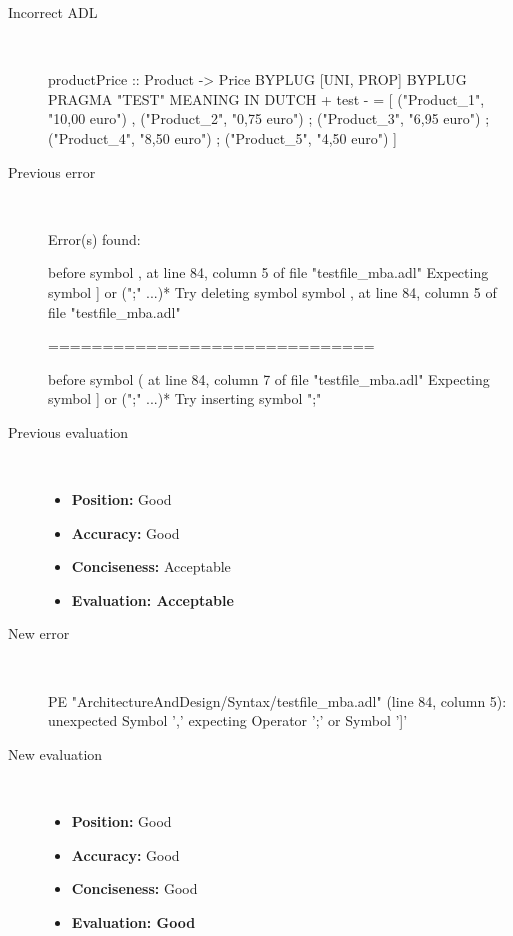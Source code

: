 \begin{description}
  \item[Incorrect ADL]~\\
\begin{adl}
productPrice :: Product -> Price BYPLUG [UNI, PROP] BYPLUG PRAGMA "TEST"
MEANING IN DUTCH  {+ test -}
  = [ ("Product_1", "10,00 euro")
    , ("Product_2", "0,75 euro")
    ; ("Product_3", "6,95 euro")
    ; ("Product_4", "8,50 euro")
    ; ("Product_5", "4,50 euro")
    ]\end{adl}
  \item[Previous error]~\\
\begin{haskell}
Error(s) found:

before symbol , at line 84, column 5 of file "testfile_mba.adl"
Expecting symbol ] or (";" ...)*
Try deleting symbol symbol , at line 84, column 5 of file "testfile_mba.adl"

==============================

before symbol ( at line 84, column 7 of file "testfile_mba.adl"
Expecting symbol ] or (";" ...)*
Try inserting symbol ";"
\end{haskell}
  \item[Previous evaluation]~\\
    \begin{itemize}
    \item \textbf{Position:} Good
    \item \textbf{Accuracy:} Good
    \item \textbf{Conciseness:} Acceptable
    \item \textbf{Evaluation: Acceptable}
    \end{itemize}
  \item[New error]~\\
\begin{haskell}
PE "ArchitectureAndDesign/Syntax/testfile_mba.adl" (line 84, column 5):
unexpected Symbol ','
expecting Operator ';' or Symbol ']'
\end{haskell}
  \item[New evaluation]~\\
    \begin{itemize}
    \item \textbf{Position:} Good
    \item \textbf{Accuracy:} Good
    \item \textbf{Conciseness:} Good
    \item \textbf{Evaluation: Good}
    \end{itemize}
  \end{description}

